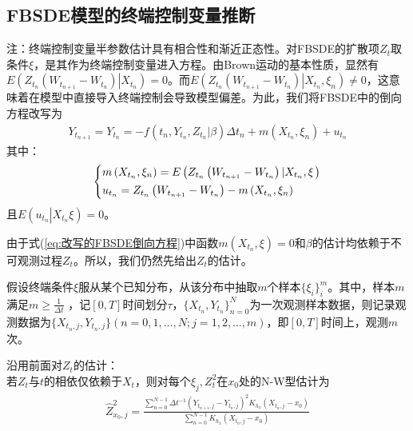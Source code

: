 	\subsection{FBSDE模型的终端控制变量推断}
		注：终端控制变量半参数估计具有相合性和渐近正态性。对FBSDE的扩散项$Z_t$取条件$\xi$，是其作为终端控制变量进入方程。由Brown运动的基本性质，显然有$E( {{Z_{{t_n}}}({{W_{{t_{n + 1}}}} - {W_{{t_n}}}})\left| {{X_{{t_n}}}} \right.}) = 0$。而$E( {{Z_{{t_n}}}({{W_{{t_{n + 1}}}} - {W_{{t_n}}}})\left| {X_{t_n}}, {\xi_{n}}\right.})\neq 0$，这意味着在模型中直接导入终端控制会导致模型偏差。为此，我们将FBSDE中的倒向方程改写为
		\begin{align*}
		{{Y_{{t_{n + 1}}}} = {Y_{{t_n}}} =  - f\left( {{t_n},{Y_{{t_n}}},{Z_{{t_n}}}\left| \beta  \right.} \right)\Delta {t_n} + m\left( {{X_{{t_n}}},{\xi _n}} \right) + {u_{{t_n}}}}
		\end{align*}
		其中：
		\begin{align}\label{eq:改写的FBSDE倒向方程}
		\centering
		\left\{\begin{lgathered}
		{m\left( {{X_{{t_n}}},{\xi _n}} \right) = E\left( {{Z_{{t_n}}}\left( {{W_{{t_{n + 1}}}} - {W_{{t_n}}}} \right)\left| {{X_{{t_n}}},\xi } \right.} \right)}\\
		{{u_{{t_n}}} = {Z_{{t_n}}}\left( {{W_{{t_{n + 1}}}} - {W_{{t_n}}}} \right) - m\left( {{X_{{t_n}}},{\xi _n}} \right)}
		\end{lgathered} \right.
		\end{align}
		且${E\left( {{u_{{t_n}}}\left| {{X_{{t_n}}}\xi } \right.} \right) = 0}$。
		\par
		由于式(\ref{eq:改写的FBSDE倒向方程})中函数$m(X_{t_n},\xi)=0$和$\beta$的估计均依赖于不可观测过程$Z_t$。所以，我们仍然先给出$Z_t$的估计。
		\par
		假设终端条件$\xi$服从某个已知分布，从该分布中抽取$m$个样本$\{ \xi_i\}_i^m$。其中，样本$m$满足$m \geqslant \frac {1}{\Delta t}$ ，记$[0,T]$时间划分$\tau$，$\{ X_{t_n},Y_{t_n}\}_{n=0}^N$为一次观测样本数据，则记录观测数据为$\{ X_{t_n,j},Y_{t_n,j}\}(n=0,1,\ldots,N;j=1,2,\ldots,m)$，即$[0,T]$时间上，观测$m$次。
		\par
		沿用前面对$Z_t$的估计：\\
		 若$Z_t$与$t$的相依仅依赖于$X_t$，则对每个$\xi_j,Z_t^2$在$x_0$处的N-W型估计为
		\begin{align*}
		\hat Z_{{x_0},j}^2 = \frac{{\sum\limits_{n = 0}^{N - 1} {\Delta {t^{ - 1}}{{\left( {{Y_{{t_{n + 1}},j}} - {Y_{{t_n},j}}} \right)}^2}{K_{{h_x}}}\left( {{X_{{t_n},j}} - {x_0}} \right)} }}{{\sum\limits_{n = 0}^{N - 1} {{K_{{h_x}}}\left( {{X_{{t_n},j}} - {x_0}} \right)} }}
		\end{align*}
